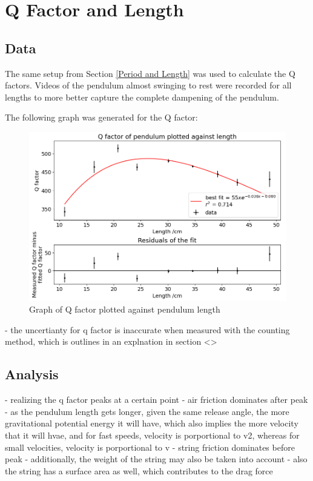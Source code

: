 \documentclass[12pt]{article}
\begin{document}
{\section{Q Factor and Length}

\subsection{Data}
The same setup from Section \ref{Period and Length} was used to calculate the Q factors. Videos of the pendulum almost swinging to rest were recorded for all lengths to more better capture the complete dampening of the pendulum.

The following graph was generated for the Q factor:
\begin{figure}[!hptb]
    \centering
    \includegraphics[width=\textwidth]{../figures/qfactor_vs_length.png}
    \caption{Graph of Q factor plotted against pendulum length}
    \label{fig:figure 7}
\end{figure}

- the uncertianty for q factor is inaccurate when measured with the counting method, which is outlines in an explnation in section <>


\subsection{Analysis}

- realizing the q factor peaks at a certain point
- air friction dominates after peak
- as the pendulum length gets longer, given the same release angle, the more gravitational potential energy it will have, which also implies the more velocity that it will hvae, and for fast speeds, velocity is porportional to v2, whereas for small velocities, velocity is porportional to v
- string friction dominates before peak
- additionally, the weight of the string may also be taken into account
- also the string has a surface area as well, which contributes to the drag force

}
\end{document}
